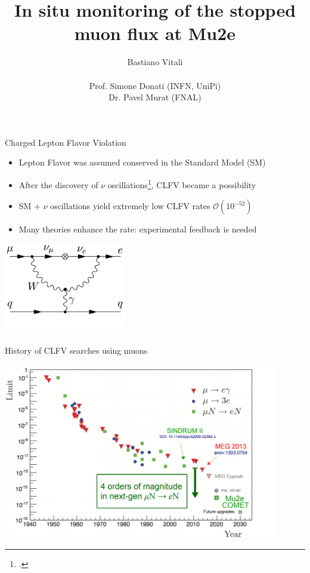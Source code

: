 \documentclass[10pt]{beamer}
\author[Bastiano Vitali]{{\Large Bastiano Vitali}\\\ \\{\small Prof. Simone Donati (INFN, UniPi)\\ Dr. Pavel Murat (FNAL)}}
\title{In situ monitoring of the stopped muon flux at Mu2e}
\date{}
\begin{document}
\begin{frame}
\titlepage
\end{frame}

\begin{frame}{Charged Lepton Flavor Violation}
\vspace{0.3cm}
\begin{itemize}
\setlength\itemsep{0.3cm}
\item Lepton Flavor was assumed conserved in the Standard Model (SM)
\item After the discovery of $\nu$ oscillations\footcite{oscillations}, CLFV became a possibility
\item SM + $\nu$ oscillations yield extremely low CLFV rates  $\mathcal{O}(10^{-52})$ %
\item Many theories enhance the rate: experimental feedback is needed
\end{itemize}
\vspace{0.5cm}
\begin{center}
\includegraphics[width=0.4\textwidth]{feynman_mu2e}
\end{center}
\end{frame}

\begin{frame}{History of CLFV searches using muons}
\begin{center}
\includegraphics[width=0.9\textwidth]{timeline_measures_3PS}
\end{center}
\end{frame}
\end{document}
